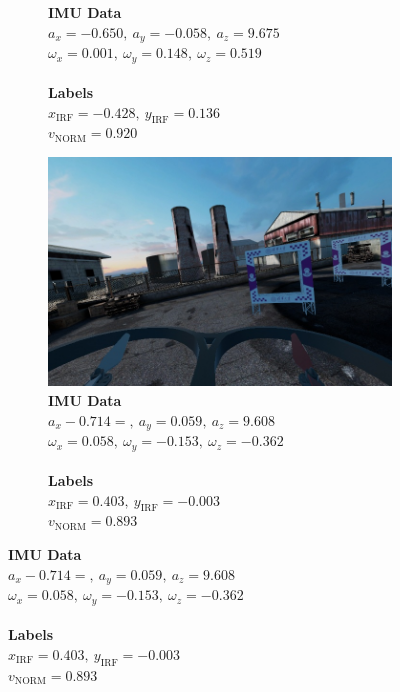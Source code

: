 \begin{figure}[H]
\begin{subfigure}[b]{1.0\textwidth}
\begin{minipage}[c]{0.37\textwidth}
	  	\end{minipage}\hfill
	  	\begin{minipage}[c]{0.5\textwidth}
			\caption{
				\textbf{IMU Data}\\
				$a_x = -0.650,\ a_y = -0.058,\ a_z = 9.675$\\
				$\omega_x = 0.001,\ \omega_y = 0.148,\ \omega_z = 0.519$\\
				\\
				\textbf{Labels}\\
				$x_\text{IRF} = -0.428,\ y_\text{IRF} = 0.136$\\
				$v_\text{NORM} = 0.920$
				}  
	  	\end{minipage}
	\end{subfigure}
	\begin{subfigure}[b]{1.0\textwidth}
		\centering
		\begin{minipage}[c]{0.37\textwidth}
			\includegraphics[width=\textwidth]{figures/camera_frame_00600.jpg}
	  	\end{minipage}\hfill
	  	\begin{minipage}[c]{0.5\textwidth}
			\caption{
				\textbf{IMU Data}\\
				$a_x -0.714= ,\ a_y = 0.059,\ a_z = 9.608$\\
				$\omega_x = 0.058,\ \omega_y = -0.153,\ \omega_z = -0.362$\\
				\\
				\textbf{Labels}\\
				$x_\text{IRF} = 0.403,\ y_\text{IRF} = -0.003$\\
				$v_\text{NORM} = 0.893$
				}  

\end{minipage}
\end{subfigure}
\end{figure}
